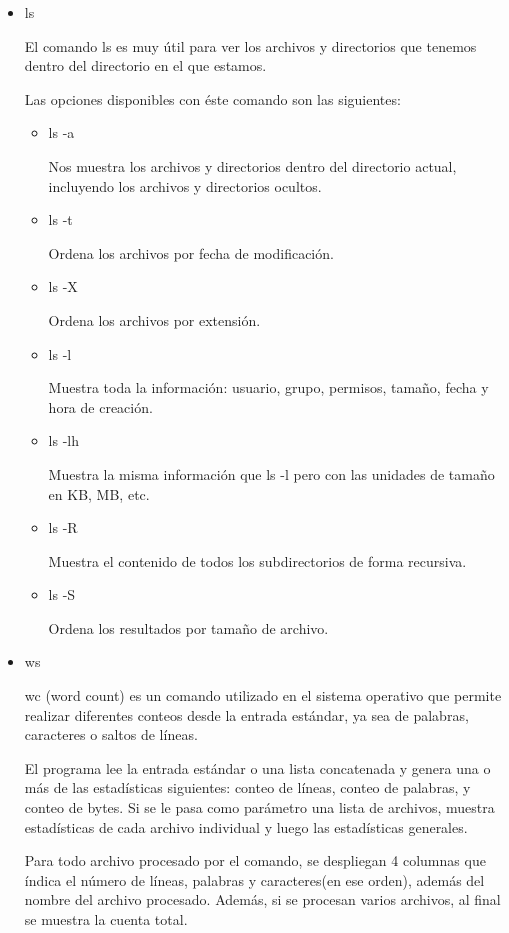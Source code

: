 \documentclass{article}
\begin{document}
\begin{itemize}
\item{ls}


El comando ls es muy útil para ver los archivos y directorios que tenemos dentro del directorio en el que estamos.

Las opciones disponibles con éste comando son las siguientes:
\begin{itemize}
\item{ls -a}

Nos muestra los archivos y directorios dentro del directorio actual, incluyendo los archivos y directorios ocultos.

\item
ls -t

Ordena los archivos por fecha de modificación.
\item
ls -X

Ordena los archivos por extensión.
\item
ls -l

Muestra toda la información: usuario, grupo, permisos, tamaño, fecha y hora de creación.
\item
ls -lh

Muestra la misma información que ls -l pero con las unidades de tamaño en KB, MB, etc.
\item
ls -R

Muestra el contenido de todos los subdirectorios de forma recursiva.
\item
ls -S

Ordena los resultados por tamaño de archivo.

\end{itemize}

\item{ws}


wc (word count) es un comando utilizado en el sistema operativo que permite realizar diferentes conteos desde la entrada estándar, ya sea de palabras, caracteres o saltos de líneas.

El programa lee la entrada estándar o una lista concatenada y genera una o más de las estadísticas siguientes: conteo de líneas, conteo de palabras, y conteo de bytes. Si se le pasa como parámetro una lista de archivos, muestra estadísticas de cada archivo individual y luego las estadísticas generales.

Para todo archivo procesado por el comando, se despliegan 4 columnas que índica el número de líneas, palabras y caracteres(en ese orden), además del nombre del archivo procesado. Además, si se procesan varios archivos, al final se muestra la cuenta total.


\end{itemize}
\end{document}
